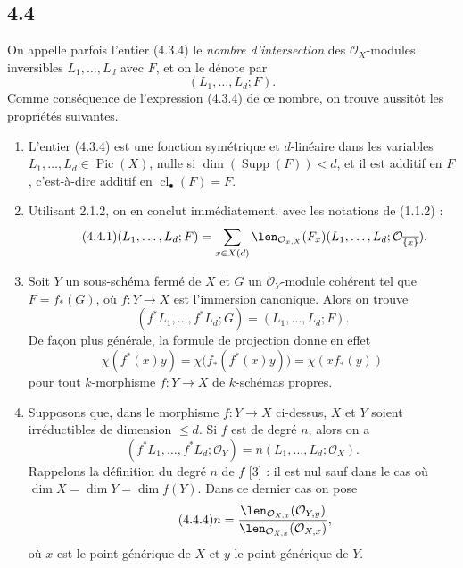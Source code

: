 \documentclass[11pt]{article}
\newcommand{\cl}{\operatorname{cl}}
\providecommand{\Pic}{\operatorname{Pic}}
\providecommand{\Supp}{\operatorname{Supp}}
\begin{document}
\subsection*{4.4}
On appelle parfois l'entier (4.3.4) le \emph{nombre d'intersection} des \(\mathcal O_X\)-modules inversibles \(L_1,\ldots,L_d\) avec \(F\), et on le dénote par
\[
 (L_1,\ldots,L_d;F).
\]
Comme conséquence de l'expression (4.3.4) de ce nombre, on trouve aussitôt les propriétés suivantes.

\begin{enumerate}[label=\arabic*)]
\item L'entier (4.3.4) est une fonction symétrique et \(d\)-linéaire dans les variables \(L_1,\ldots,L_d\in\Pic(X)\), nulle si \(\dim(\Supp(F))<d\), et il est additif en \(F\), c'est-à-dire additif en \(\cl_\bullet(F)=F\).

\item Utilisant 2.1.2, on en conclut immédiatement, avec les notations de (1.1.2) :
\begin{equation}\tag{4.4.1}
 (L_1,\ldots,L_d;F)
 =
 \sum_{x\in X(d)}
 \len_{\mathcal O_{x,X}}(F_x)
 (L_1,\ldots,L_d;\mathcal O_{\overline{\{x\}}}).
\end{equation}

\item Soit \(Y\) un sous-schéma fermé de \(X\) et \(G\) un \(\mathcal O_Y\)-module cohérent tel que \(F=f_*(G)\), où \(f:Y\to X\) est l'immersion canonique. Alors on trouve
\[
 (f^*L_1,\ldots,f^*L_d;G)=(L_1,\ldots,L_d;F).
\]
De façon plus générale, la formule de projection donne en effet
\begin{equation}\tag{4.4.2}
 \chi(f^*(x)y)=\chi\bigl(f_*(f^*(x)y)\bigr)=\chi(xf_*(y))
\end{equation}
pour tout \(k\)-morphisme \(f:Y\to X\) de \(k\)-schémas propres.

\item Supposons que, dans le morphisme \(f:Y\to X\) ci-dessus, \(X\) et \(Y\) soient irréductibles de dimension \(\leq d\). Si \(f\) est de degré \(n\), alors on a
\begin{equation}\tag{4.4.3}
 (f^*L_1,\ldots,f^*L_d;\mathcal O_Y)
 =
 n(L_1,\ldots,L_d;\mathcal O_X).
\end{equation}
Rappelons la définition du degré \(n\) de \(f\) [3] : il est nul sauf dans le cas où \(\dim X=\dim Y=\dim f(Y)\). Dans ce dernier cas on pose
\begin{equation}\tag{4.4.4}
 n=
 \frac{\len_{\mathcal O_{X,x}}(\mathcal O_{Y,y})}
      {\len_{\mathcal O_{X,x}}(\mathcal O_{X,x})},
\end{equation}
où \(x\) est le point générique de \(X\) et \(y\) le point générique de \(Y\).
\end{enumerate}
\end{document}
